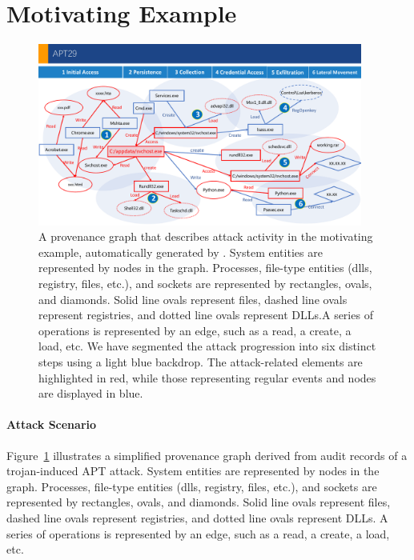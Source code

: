 \section{Motivating Example}
\label{sec:motivation}

\begin{figure}[ht]
    \centering
    \includegraphics[width=0.95\textwidth]{figs/example.pdf}
    \caption{A provenance graph that describes attack activity in the motivating example, automatically generated by \tool. System entities are represented by nodes in the graph. Processes, file-type entities (dlls, registry, files, etc.), and sockets are represented by rectangles, ovals, and diamonds. Solid line ovals represent files, dashed line ovals represent registries, and dotted line ovals represent DLLs.A series of operations is represented by an edge, such as a read, a create, a load, etc. We have segmented the attack progression into six distinct steps using a light blue backdrop. The attack-related elements are highlighted in red, while those representing regular events and nodes are displayed in blue.}
    \label{fig-example}
    \end{figure}

\paragraph{Attack Scenario}
Figure~\ref{fig-example} illustrates a simplified provenance graph derived from audit records of a trojan-induced APT attack. System entities are represented by nodes in the graph. 
Processes, file-type entities (dlls, registry, files, etc.), and sockets are represented by rectangles, ovals, and diamonds. Solid line ovals represent files, dashed line ovals represent registries, and dotted line ovals represent DLLs.
A series of operations is represented by an edge, such as a read, a create, a load, etc.

